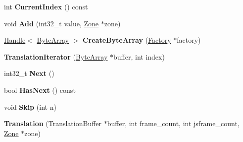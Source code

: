 \begin{DoxyCompactItemize}
\item 
int {\bfseries Current\+Index} () const \hypertarget{classv8_1_1internal_1_1_b_a_s_e___e_m_b_e_d_d_e_d_afa1681d7b86afbdfd5f395143a804a13}{}\label{classv8_1_1internal_1_1_b_a_s_e___e_m_b_e_d_d_e_d_afa1681d7b86afbdfd5f395143a804a13}

\item 
void {\bfseries Add} (int32\+\_\+t value, \hyperlink{classv8_1_1internal_1_1_zone}{Zone} $\ast$zone)\hypertarget{classv8_1_1internal_1_1_b_a_s_e___e_m_b_e_d_d_e_d_aa7448d576167c4c19fe0727f192a130f}{}\label{classv8_1_1internal_1_1_b_a_s_e___e_m_b_e_d_d_e_d_aa7448d576167c4c19fe0727f192a130f}

\item 
\hyperlink{classv8_1_1internal_1_1_handle}{Handle}$<$ \hyperlink{classv8_1_1internal_1_1_byte_array}{Byte\+Array} $>$ {\bfseries Create\+Byte\+Array} (\hyperlink{classv8_1_1internal_1_1_factory}{Factory} $\ast$factory)\hypertarget{classv8_1_1internal_1_1_b_a_s_e___e_m_b_e_d_d_e_d_afcd30a3493088912f1f4b8c998efd482}{}\label{classv8_1_1internal_1_1_b_a_s_e___e_m_b_e_d_d_e_d_afcd30a3493088912f1f4b8c998efd482}

\item 
{\bfseries Translation\+Iterator} (\hyperlink{classv8_1_1internal_1_1_byte_array}{Byte\+Array} $\ast$buffer, int index)\hypertarget{classv8_1_1internal_1_1_b_a_s_e___e_m_b_e_d_d_e_d_a5be35b08294e04358650c4418fd45293}{}\label{classv8_1_1internal_1_1_b_a_s_e___e_m_b_e_d_d_e_d_a5be35b08294e04358650c4418fd45293}

\item 
int32\+\_\+t {\bfseries Next} ()\hypertarget{classv8_1_1internal_1_1_b_a_s_e___e_m_b_e_d_d_e_d_a58fb813748d05c8dcebdcbb4a29b6915}{}\label{classv8_1_1internal_1_1_b_a_s_e___e_m_b_e_d_d_e_d_a58fb813748d05c8dcebdcbb4a29b6915}

\item 
bool {\bfseries Has\+Next} () const \hypertarget{classv8_1_1internal_1_1_b_a_s_e___e_m_b_e_d_d_e_d_ab95af53d999491af4d512a893fb3b884}{}\label{classv8_1_1internal_1_1_b_a_s_e___e_m_b_e_d_d_e_d_ab95af53d999491af4d512a893fb3b884}

\item 
void {\bfseries Skip} (int n)\hypertarget{classv8_1_1internal_1_1_b_a_s_e___e_m_b_e_d_d_e_d_a1e4a2ef31686ca4ae24ff061e7d3c007}{}\label{classv8_1_1internal_1_1_b_a_s_e___e_m_b_e_d_d_e_d_a1e4a2ef31686ca4ae24ff061e7d3c007}

\item 
{\bfseries Translation} (Translation\+Buffer $\ast$buffer, int frame\+\_\+count, int jsframe\+\_\+count, \hyperlink{classv8_1_1internal_1_1_zone}{Zone} $\ast$zone)\hypertarget{classv8_1_1internal_1_1_b_a_s_e___e_m_b_e_d_d_e_d_a4146d6a14f28636e8bf19dcda59bd29c}{}\label{classv8_1_1internal_1_1_b_a_s_e___e_m_b_e_d_d_e_d_a4146d6a14f28636e8bf19dcda59bd29c}


\end{DoxyCompactItemize}
